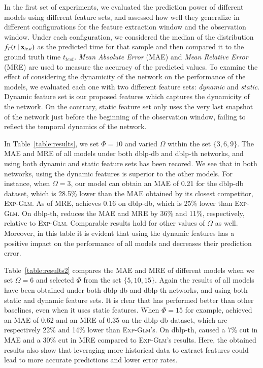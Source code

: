 In the first set of experiments, we evaluated the prediction power of different models using different feature sets, and assessed how well they generalize in different configurations for the feature extraction window and the observation window. Under each configuration, we considered the median of the distribution $f_T(t\mid \mathbf{x}_{test})$ as the predicted time for that sample and then compared it to the ground truth time $t_{test}$. \emph{Mean Absolute Error} (MAE) and \emph{Mean Relative Error} (MRE) are used to measure the accuracy of the predicted values. To examine the effect of considering the dynamicity of the network on the performance of the models, we evaluated each one with two different feature sets: \emph{dynamic} and \emph{static}. Dynamic feature set is our proposed features which captures the dynamicity of the network. On the contrary, static feature set only uses the very last snapshot of the network just before the beginning of the observation window, failing to reflect the temporal dynamics of the network. 

In Table~\ref{table:results}, we set $\Phi=10$ and varied $\Omega$ within the set $\{3,6,9\}$. The MAE and MRE of all models under both dblp-db and dblp-th networks, and using both dynamic and static feature sets has been recored. We see that in both networks, \npglm using the dynamic features is superior to the other models. For instance, when $\Omega=3$, our model \npglm can obtain an MAE of 0.21 for the dblp-db dataset, which is 28.5\% lower than the MAE obtained by its closest competitor, \textsc{Exp-Glm}. As of MRE, \npglm achieves 0.16 on dblp-db, which is 25\% lower than \textsc{Exp-Glm}. 
On dblp-th, \npglm reduces the MAE and MRE by 36\% and 11\%, respectively, relative to \textsc{Exp-Glm}. Comparable results hold for other values of $\Omega$ as well. Moreover, in this table it is evident that using the dynamic features has a positive impact on the performance of all models and decreases their prediction error.

Table~\ref{table:results2} compares the MAE and MRE of different models when we set $\Omega=6$ and selected $\Phi$ from the set $\{5,10,15\}$. Again the results of all models have been obtained under both dblp-db and dblp-th networks, and using both static and dynamic feature sets. It is clear that \npglm has performed better than other baselines, even when it uses static features.
When $\Phi=15$ for example, \npglm achieved an MAE of 0.62 and an MRE of 0.35 on the dblp-db dataset, which are respectively 22\% and 14\% lower than \textsc{Exp-Glm}'s. On dblp-th, \npglm caused a 7\% cut in MAE and a 30\% cut in MRE compared to \textsc{Exp-Glm}'s results.
Here, the obtained results also show that leveraging more historical data to extract features could lead to more accurate predictions and lower error rates.

